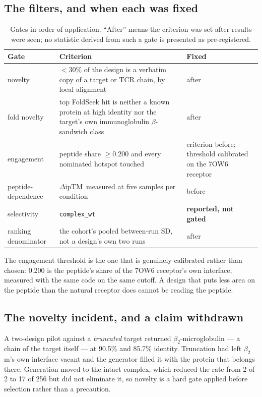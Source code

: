 \documentclass[11pt,a4paper]{article}
\newcommand{\drop}{\ensuremath{\Delta\text{ipTM}}}
\begin{document}
\subsection{The filters, and when each was fixed}

\begin{table}[h]
\centering
\caption{Gates in order of application. ``After'' means the criterion was set after results were
seen; no statistic derived from such a gate is presented as pre-registered.}
\small
\begin{tabular}{p{2.5cm}p{7.6cm}p{3.1cm}}
\toprule
Gate & Criterion & Fixed \\
\midrule
novelty & $<30\%$ of the design is a verbatim copy of a target or TCR chain, by local alignment & after \\
fold novelty & top FoldSeek hit is neither a known protein at high identity nor the target's own immunoglobulin $\beta$-sandwich class & after \\
engagement & peptide share $\geq 0.200$ and every nominated hotspot touched & criterion before; threshold calibrated on the 7OW6 receptor \\
peptide-dependence & \drop\ measured at five samples per condition & before \\
selectivity & \texttt{complex\_wt} & \textbf{reported, not gated} \\
ranking denominator & the cohort's pooled between-run SD, not a design's own two runs & after \\
\bottomrule
\end{tabular}
\end{table}

The engagement threshold is the one that is genuinely calibrated rather than chosen: 0.200 is the
peptide's share of the 7OW6 receptor's own interface, measured with the same code on the same
cutoff. A design that puts less area on the peptide than the natural receptor does cannot be
reading the peptide.

\subsection{The novelty incident, and a claim withdrawn}

A two-design pilot against a \emph{truncated} target returned $\beta_2$-microglobulin --- a chain
of the target itself --- at 90.5\% and 85.7\% identity. Truncation had left $\beta_2$m's own
interface vacant and the generator filled it with the protein that belongs there. Generation moved
to the intact complex, which reduced the rate from 2 of 2 to 17 of 256 but did not eliminate it,
so novelty is a hard gate applied before selection rather than a precaution.
\end{document}
